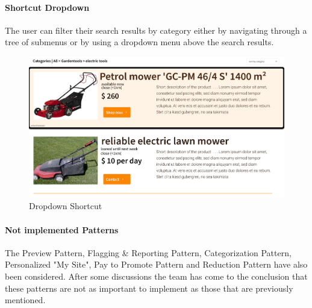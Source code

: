	\paragraph{Shortcut Dropdown}
		The user can filter their search results by category either by navigating through a tree of submenus or by using a dropdown menu above the search results.
		\begin{figure}[H]
			\centering
			\includegraphics[width=\linewidth]{abb/3_design_guidelines/dropdown_shortcut.png}
			\caption{Dropdown Shortcut}
			\label{fig:dropdown_shortcut}
		\end{figure}
	\par
	
	\paragraph{Not implemented Patterns}
		The Preview Pattern, Flagging \& Reporting Pattern, Categorization Pattern,  Personalized "My Site", Pay to Promote Pattern and Reduction Pattern have also been considered. After some discussions the team has come to the conclusion that these patterns are not as important to implement as those that are previously mentioned.
	\par
	
	
	
	